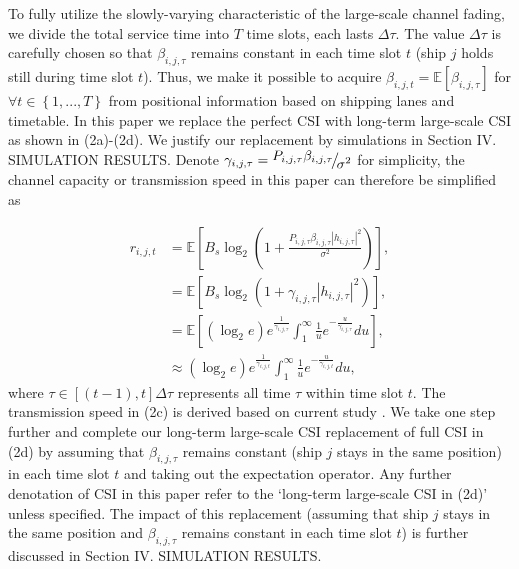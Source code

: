 \documentclass{ieeeaccess}
\begin{document}
To fully utilize the slowly-varying characteristic of the large-scale channel fading, we divide the total service time into $T$ time slots, each lasts $\Delta \tau$. The value $\Delta \tau$ is carefully chosen so that $\beta _{i,j,\tau }$ remains constant in each time slot $t$ (ship $j$ holds still during time slot $t$). Thus, we make it possible to acquire $\beta _{i,j,t} = \mathbb{E} \left [ {\beta _{i,j,\tau }} \right ]$ for $\forall t \in \left\{ {1,...,T} \right\}$ from positional information based on shipping lanes and timetable. 
In this paper we replace the perfect CSI with long-term large-scale CSI as shown in (2a)-(2d). We justify our replacement by simulations in Section IV. SIMULATION RESULTS. Denote ${\gamma _{i,j,\tau }} = {\raise0.7ex\hbox{${{P_{i,j,\tau }}{\beta _{i,j,\tau }}}$} \!\mathord{\left/
 {\vphantom {{{P_{i,j,\tau }}{\beta _{i,j,\tau }}} {{\sigma ^2}}}}\right.\kern-\nulldelimiterspace}
\!\lower0.7ex\hbox{${{\sigma ^2}}$}}$ for simplicity, the channel capacity or transmission speed in this paper can therefore be simplified as

\begin{subequations}
\begin{align}
{r_{i,j,t}} & = {\mathbb{E}}\left [ {{B_s}{{\log }_2}\left( {1 + \frac{{{P_{i,j,\tau }}{\beta _{i,j,\tau }}{{\left| {{h_{i,j,\tau }}} \right|}^2}}}{{{\sigma ^2}}}} \right)} \right ] ,\\
& = {\mathbb{E}}\left [  {B_s}{\log }_2 \left( {1 + {\gamma _{i,j,\tau }}{{\left| {{h_{i,j,\tau }}} \right|}^2}} \right)  \right ] ,\\
& = {\mathbb{E}}\left [  \left( {{{\log }_2}e} \right){e^{\frac{1}{{{\gamma _{i,j,\tau }}}}}}\int_1^\infty  {\frac{1}{u}{e^{ - \frac{u}{{{\gamma _{i,j,\tau }}}}}}du} \right ] ,\\
&  \approx \left( {{{\log }_2}e} \right){e^{\frac{1}{{{\gamma _{i,j,t}}}}}}\int_1^\infty  {\frac{1}{u}{e^{ - \frac{u}{{{\gamma _{i,j,t}}}}}}du} ,
\end{align}
\end{subequations}
where $\tau  \in \left[ {\left( {t - 1} \right),t} \right]\Delta \tau$ represents all time $\tau $ within time slot $t$. 
The transmission speed in (2c) is derived based on current study \cite{p41}. We take one step further and complete our long-term large-scale CSI replacement of full CSI in (2d) by assuming that $\beta _{i,j,\tau }$ remains constant (ship $j$ stays in the same position) in each time slot $t$ and taking out the expectation operator. Any further denotation of CSI in this paper refer to the `long-term large-scale CSI in (2d)' unless specified. The impact of this replacement (assuming that ship $j$ stays in the same position and $\beta _{i,j,\tau }$ remains constant in each time slot $t$) is further discussed in Section IV. SIMULATION RESULTS. 
\end{document}
